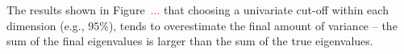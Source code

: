 {The results shown in Figure~\textcolor{red}{...} that choosing a univariate cut-off within each dimension (e.g., $95\%$), tends to overestimate the final amount of variance – the sum of the final eigenvalues is larger than the sum of the true eigenvalues.}



